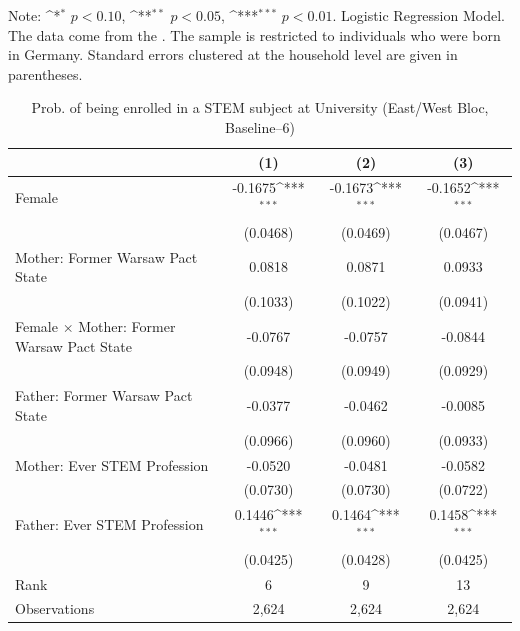 \documentclass[a4paper, oneside, hyperfootnotes = false]{article}
\def\sym#1{\ifmmode^{#1}\else\(^{#1}\)\fi}
\begin{document}
{\begin{table}[ht]
\begin{center}
		\parbox{10cm}{
			\linespread{1}\footnotesize Note: \sym{*} \(p<0.10\), \sym{**} \(p<0.05\), \sym{***} \(p<0.01\). Logistic Regression Model. The data come from the \cite{SOEP2023}. The sample is restricted to individuals who were born in Germany. Standard errors clustered at the household level are given in parentheses.}
		
	\end{center}
\end{table}

\begin{table}[ht]
	\caption[STEM subject at University (East/West Bloc, Baseline--6)]{Prob. of being enrolled in a STEM subject at University (East/West Bloc, Baseline--6)}
	\label{tab:extension}
	\begin{center}
		\begin{tabular}{l*{3}{c}}
			\toprule
			&\multicolumn{1}{c}{(1)}         &\multicolumn{1}{c}{(2)}         &\multicolumn{1}{c}{(3)}         \\
			\midrule
			Female              &     -0.1675\sym{***}&     -0.1673\sym{***}&     -0.1652\sym{***}\\
			&    (0.0468)         &    (0.0469)         &    (0.0467)         \\
			\addlinespace
			Mother: Former Warsaw Pact State&      0.0818         &      0.0871         &      0.0933         \\
			&    (0.1033)         &    (0.1022)         &    (0.0941)         \\
			\addlinespace
			Female $\times$ Mother: Former Warsaw Pact State&     -0.0767         &     -0.0757         &     -0.0844         \\
			&    (0.0948)         &    (0.0949)         &    (0.0929)         \\
			\addlinespace
			Father: Former Warsaw Pact State&     -0.0377         &     -0.0462         &     -0.0085         \\
			&    (0.0966)         &    (0.0960)         &    (0.0933)         \\
			\addlinespace
			Mother: Ever STEM Profession&     -0.0520         &     -0.0481         &     -0.0582         \\
			&    (0.0730)         &    (0.0730)         &    (0.0722)         \\
			\addlinespace
			Father: Ever STEM Profession&      0.1446\sym{***}&      0.1464\sym{***}&      0.1458\sym{***}\\
			&    (0.0425)         &    (0.0428)         &    (0.0425)         \\
			\midrule
			Rank                &      6         &      9         &     13         \\
			Observations                  &   2,624         &   2,624         &   2,624         \\
			\bottomrule
		\end{tabular}
		

\end{center}
\end{table}}
\end{document}
